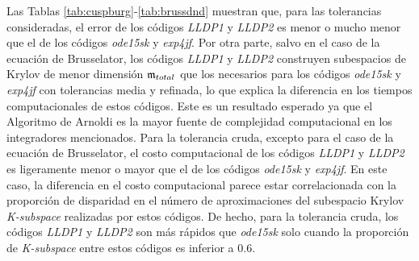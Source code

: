 Las Tablas \ref{tab:cuspburg}-\ref{tab:brussdnd} muestran que, para las tolerancias consideradas, el error de los códigos \emph{LLDP1} y \emph{LLDP2} es menor o mucho menor que el de los códigos \emph{ode15sk} y \emph{exp4jf}. Por otra parte, salvo en el caso de la ecuación de Brusselator, los códigos \emph{LLDP1} y \emph{LLDP2} construyen subespacios de Krylov de menor dimensión $\mathfrak{m}_{total}$ que los necesarios para los códigos \emph{ode15sk } y \emph{exp4jf} con tolerancias media y refinada, lo que explica la diferencia en los tiempos computacionales de estos códigos. Este es un resultado esperado ya que el Algoritmo de Arnoldi es la mayor fuente de complejidad computacional en los integradores mencionados. Para la tolerancia cruda, excepto para el caso de la ecuación de Brusselator, el costo computacional de los códigos \emph{LLDP1} y \emph{LLDP2} es ligeramente menor o mayor que el de los códigos \emph{ode15sk} y \emph{ exp4jf}. En este caso, la diferencia en el costo computacional parece estar correlacionada con la proporción de disparidad en el número de aproximaciones del subespacio Krylov \textit{K-subspace} realizadas por estos códigos. De hecho, para la tolerancia cruda, los códigos \emph{LLDP1} y \emph{LLDP2} son más rápidos que \emph{ode15sk} solo cuando la proporción de \textit{K-subspace} entre estos códigos es inferior a $0.6$.

